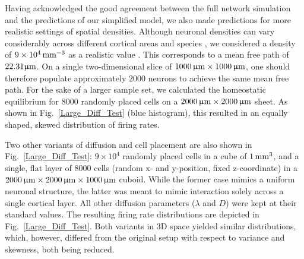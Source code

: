 \documentclass[10pt,letterpaper]{article}
\begin{document}
Having acknowledged the good agreement between the full network simulation and the predictions of our simplified model, we also made predictions for more realistic settings of spatial densities. Although neuronal densities can vary considerably across different cortical areas and species \cite{Collins_2010}, we considered a density of $\rm 9\times 10^4\, mm^{-3}$ as a realistic value \cite{Schuez_1989}. This corresponds to a mean free path of $\rm 22.31 \upmu m$. On a single two-dimensional slice of $\rm 1000\, \upmu m \times 1000\, \upmu m$, one should therefore populate approximately $2000$ neurons to achieve the same mean free path. For the sake of a larger sample set, we calculated the homeostatic equilibrium for $8000$ randomly placed cells on a $\rm 2000\, \upmu m \times 2000\, \upmu m$ sheet. As shown in Fig.~\ref{Large_Diff_Test} (blue histogram), this resulted in an equally shaped, skewed distribution of firing rates.  

Two other variants of diffusion and cell placement are also shown in Fig.~\ref{Large_Diff_Test}: $9\times 10^4$ randomly placed cells in a cube of $\rm 1\, mm^3$, and a single, flat layer of $8000$ cells (random x- and y-position, fixed z-coordinate) in a $\rm 2000 \, \upmu m \times 2000 \, \upmu m \times 1000 \, \upmu m$ cuboid. While the former case mimics a uniform neuronal structure, the latter was meant to mimic interaction solely across a single cortical layer. All other diffusion parameters ($\lambda$ and $D$) were kept at their standard values. The resulting firing rate distributions are depicted in Fig.~\ref{Large_Diff_Test}. Both variants in 3D space yielded similar distributions, which, however, differed from the original setup with respect to variance and skewness, both being reduced.
\end{document}
